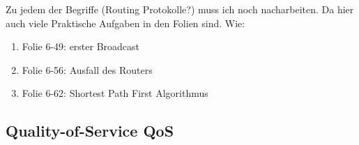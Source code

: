 \documentclass[a4paper]{article}
\begin{document}
Zu jedem der Begriffe (Routing Protokolle?) muss ich noch nacharbeiten. Da hier auch viele Praktische Aufgaben in den Folien sind. Wie:

\begin{enumerate}
    \item Folie 6-49: erster Broadcast
    \item Folie 6-56: Ausfall des Routers
    \item Folie 6-62: Shortest Path First Algorithmus
\end{enumerate}

\subsection{Quality-of-Service QoS}




\end{document}
